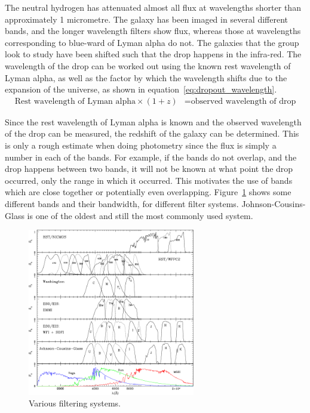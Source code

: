 		The neutral hydrogen has attenuated almost all flux at wavelengths shorter than approximately 1 micrometre. The galaxy has been imaged in several different bands, and the longer wavelength filters show flux, whereas those at wavelengths corresponding to blue-ward of Lyman alpha do not. The galaxies that the group look to study have been shifted such that the drop happens in the infra-red. The wavelength of the drop can be worked out using the known rest wavelength of Lyman alpha, as well as the factor by which the wavelength shifts due to the expansion of the universe, as shown in equation~\ref{eq:dropout_wavelength}.
		\begin{align}
			\text{Rest wavelength of Lyman alpha} \times (1+z) &= \text{observed wavelength of drop}\label{eq:dropout_wavelength}
		\end{align}

		Since the rest wavelength of Lyman alpha is known and the observed wavelength of the drop can be measured, the redshift of the galaxy can be determined. This
		is only a rough estimate when doing photometry since the flux is simply a number in each of the bands. For example, if the bands do not overlap, and the drop happens between two bands, it will not be known at what point the drop occurred, only the range in which it occurred. This motivates the use of bands which are close together or potentially even overlapping. Figure~\ref{fig:filter-systems} shows some different bands and their bandwidth, for different filter systems. Johnson-Cousins- Glass is one of the oldest and still the most commonly used system\cite{BasicObservationalKnowledge}.
		\begin{figure}[ht]
			\centering
			\includegraphics[width=0.65\textwidth]{../Images/filter-systems.png}
			\caption{Various filtering systems\cite{refId0}.\label{fig:filter-systems}}
		\end{figure}

